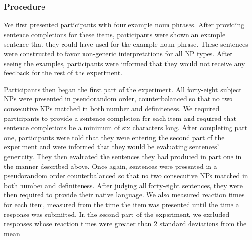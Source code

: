 \documentclass[10pt,letterpaper]{article}
\begin{document}
\subsubsection{Procedure} 

We first presented participants with four example noun phrases. After providing sentence completions for these items, participants were shown an example sentence that they could have used for the example noun phrase. These sentences were constructed to favor non-generic interpretations for all NP types. After seeing the examples, participants were informed that they would not receive any feedback for the rest of the experiment.

Participants then began the first part of the experiment. All forty-eight subject NPs were presented in pseudorandom order, counterbalanced so that no two consecutive NPs matched in both number and definiteness. We required participants to provide a sentence completion for each item and required that sentence completions be a minimum of six characters long. After completing part one, participants were told that they were entering the second part of the experiment and were informed that they would be evaluating sentences' genericity. They then evaluated the sentences they had produced in part one in the manner described above. Once again, sentences were presented in a pseudorandom order counterbalanced so that no two consecutive NPs matched in both number and definiteness. After judging all forty-eight sentences, they were then required to provide their native language. We also measured reaction times for each item, measured from the time the item was presented until the time a response was submitted. In the second part of the experiment, we excluded responses whose reaction times were greater than 2 standard deviations from the mean.

\end{document}

